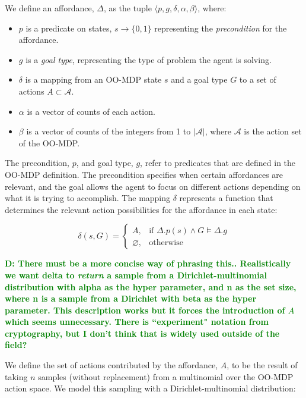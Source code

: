 \documentclass[conference]{IEEEtran}
\newcommand{\dnote}[1]{\textcolor{Green}{\textbf{D: #1}}}
\begin{document}
 We define an affordance, $\Delta$, as the tuple $\langle p, g, \delta, \alpha, \beta \rangle$,
where:
\begin{itemize}
\item $p$ is a predicate on states, $s \longrightarrow \{$0$, 1\}$ representing the {\em precondition} for the affordance. 
\item $g$ is a {\it goal type}, representing the type of problem the agent is solving.
\item $\delta$ is a mapping from an OO-MDP state $s$ and a goal type $G$ to a set of actions $A \subset \mathcal{A}$.
\item $\alpha$ is a vector of counts of each action.
\item $\beta$ is a vector of counts of the integers from 1 to $|\mathcal{A}|$, where $\mathcal{A}$ is the action set of the OO-MDP.
\end{itemize}

The precondition, $p$, and goal type, $g$, refer to predicates that are defined in the OO-MDP definition.
The precondition specifies when certain affordances are relevant, and the goal allows the agent to focus
on different actions depending on what it is trying to accomplish. The mapping $\delta$
represents a function that determines the relevant action possibilities for the affordance in each state:

\begin{equation}
\delta(s,G)= 
\begin{cases}
    A, & \text{if } \Delta.p(s) \wedge G \models \Delta.g \\
    \varnothing,              & \text{otherwise}
\end{cases}
\label{eq:delta_mapping}
\end{equation}

\dnote{There must be a more concise way of phrasing this.. Realistically we want delta to {\it return} a sample from a Dirichlet-multinomial distribution with alpha as the hyper parameter, and n as the set size, where n is a sample from a Dirichlet with beta as the hyper parameter. This description works but it forces the introduction of $A$ which seems unnecessary. There is ``experiment" notation from cryptography, but I don't think that is widely used outside of the field?}

We define the set of actions contributed by the affordance, $A$, to be the result
of taking $n$ samples (without replacement) from a multinomial over the OO-MDP
action space. We model this sampling with a Dirichlet-multinomial distribution:
\end{document}
